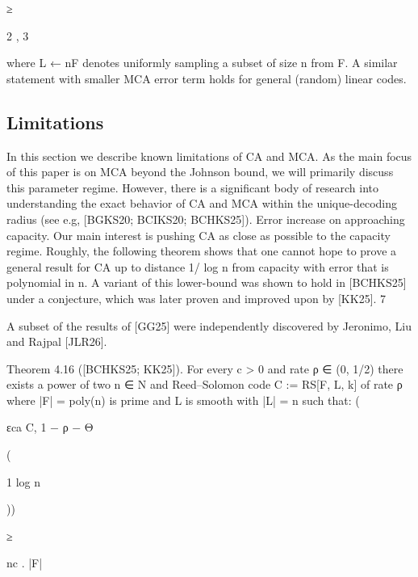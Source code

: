 \documentclass[11pt]{article}
\begin{document}
≥

2
,
3



where L ← nF denotes uniformly sampling a subset of size n from F.
A similar statement with smaller MCA error term holds for general (random) linear codes.


\subsection{Limitations}



In this section we describe known limitations of CA and MCA. As the main focus of this paper is on
MCA beyond the Johnson bound, we will primarily discuss this parameter regime. However, there
is a significant body of research into understanding the exact behavior of CA and MCA within the
unique-decoding radius (see e.g, [BGKS20; BCIKS20; BCHKS25]).
Error increase on approaching capacity. Our main interest is pushing CA as close as possible
to the capacity regime. Roughly, the following theorem shows that one cannot hope to prove a
general result for CA up to distance 1/ log n from capacity with error that is polynomial in n. A
variant of this lower-bound was shown to hold in [BCHKS25] under a conjecture, which was later
proven and improved upon by [KK25].
7

A subset of the results of [GG25] were independently discovered by Jeronimo, Liu and Rajpal [JLR26].

Theorem 4.16 ([BCHKS25; KK25]). For every c > 0 and rate ρ ∈ (0, 1/2) there exists a power
of two n ∈ N and Reed–Solomon code C := RS[F, L, k] of rate ρ where |F| = poly(n) is prime and
L is smooth with |L| = n such that:
(

εca C, 1 − ρ − Θ

(

1
log n

))

≥

nc
.
|F|
\end{document}
